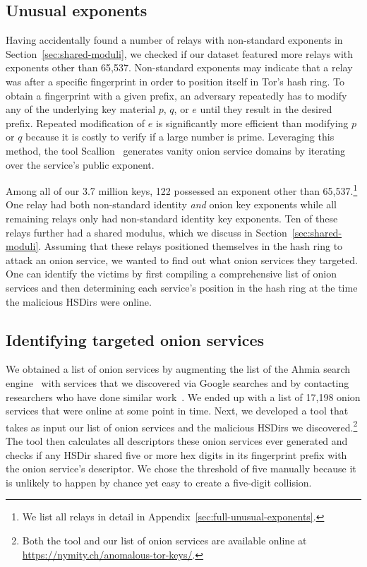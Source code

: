 \subsection{Unusual exponents}
\label{sec:unusual-exponents}
Having accidentally found a number of relays with non-standard exponents in
Section~\ref{sec:shared-moduli}, we checked if our dataset featured more relays
with exponents other than 65,537.  Non-standard exponents may indicate that a
relay was after a specific fingerprint in order to position itself in Tor's hash
ring.  To obtain a fingerprint with a given prefix, an adversary repeatedly has
to modify any of the underlying key material $p$, $q$, or $e$ until they result
in the desired prefix.  Repeated modification of $e$ is significantly more
efficient than modifying $p$ or $q$ because it is costly to verify if a large
number is prime.  Leveraging this method, the tool Scallion~\cite{scallion}
generates vanity onion service domains by iterating over the service's public
exponent.

Among all of our 3.7 million keys, 122 possessed an exponent other than
65,537.\footnote{We list all relays in detail in
Appendix~\ref{sec:full-unusual-exponents}.} One relay had both non-standard
identity \emph{and} onion key exponents while all remaining relays only had
non-standard identity key exponents.  Ten of these relays further had a shared
modulus, which we discuss in Section~\ref{sec:shared-moduli}.  Assuming that
these relays positioned themselves in the hash ring to attack an onion service,
we wanted to find out what onion services they targeted.  One can identify the
victims by first compiling a comprehensive list of onion services and then
determining each service's position in the hash ring at the time the malicious
HSDirs were online.

\subsection{Identifying targeted onion services}
\label{sec:targeted-onion-services}

We obtained a list of onion services by augmenting the list of the Ahmia
search engine~\cite{ahmia} with services that we discovered via Google searches
and by contacting researchers who have done similar work~\cite{Matic2015a}.  We
ended up with a list of 17,198 onion services that were online at some point in
time.  Next, we developed a tool that takes as input our list of onion services
and the malicious HSDirs we discovered.\footnote{Both the tool and our list of
onion services are available online at
\url{https://nymity.ch/anomalous-tor-keys/}.} The tool then calculates all
descriptors these onion services ever generated and checks if any HSDir shared
five or more hex digits in its fingerprint prefix with the onion service's
descriptor.  We chose the threshold of five manually because it is unlikely to
happen by chance yet easy to create a five-digit collision.

